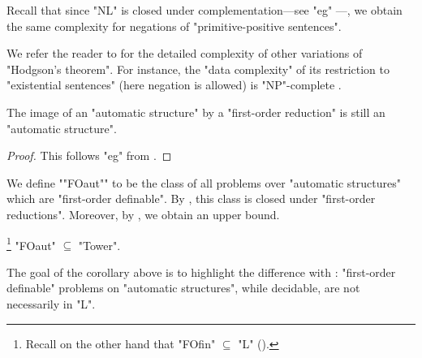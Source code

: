 Recall that since "NL" is closed under complementation---see "eg" \cite[Corollary~9.23]{Immerman1998DescriptiveComplexity}---, we obtain the same complexity for
negations of "primitive-positive sentences".

We refer the reader to \cite[\S~3]{BlumensathGradel2000AutomaticStructures} for the detailed 
complexity of other variations of "Hodgson's theorem". For instance,
the "data complexity" of its restriction to "existential sentences" (here negation is allowed)
is "NP"-complete \cite[Theorem~3.7]{BlumensathGradel2000AutomaticStructures}.

\begin{proposition}[Folklore]
	\AP\label{prop:first-order-reduction-preserve-automaticity}
	The image of an "automatic structure" by a "first-order reduction" is
	still an "automatic structure".
\end{proposition}
\begin{proof}
	This follows "eg" from .
\end{proof}

We define \AP""FOaut"" to be the class of all problems over "automatic structures"
which are "first-order definable". By ,
this class is closed under "first-order reductions". Moreover,
by , we obtain an upper bound.

\begin{corollary}
	\!\footnote{Recall on the other hand that "FOfin" $\subseteq$ "L" ().}
	"FOaut" $\subseteq$ "Tower".
\end{corollary}

The goal of the corollary above is to highlight the difference with :
"first-order definable" problems on "automatic structures", while decidable, are not necessarily
in "L".


